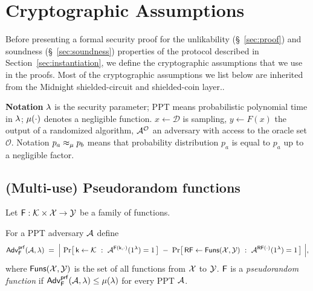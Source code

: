 \section{Cryptographic Assumptions}
\label{sec:assumptions}

Before presenting a formal security proof for the unlikability (\S~\ref{sec:proof}) and soundness (\S~\ref{sec:soundness})
properties of the protocol described in Section~\ref{sec:instantiation},
we define the cryptographic assumptions that we use in the proofs.
Most of the cryptographic assumptions we list below are inherited from the Midnight shielded-circuit and shielded-coin layer..


\vspace{5pt}
\noindent
\textbf{Notation}
$\lambda$ is the security parameter; PPT means probabilistic polynomial time in $\lambda$;
$\mu(\cdot)$ denotes a negligible function. $x \gets \mathcal{D}$ is sampling, $y \gets F(x)$ the output of a randomized algorithm, $\mathcal{A}^{\mathcal{O}}$ an adversary with access to the oracle set
$\mathcal{O}$.
Notation  $p_a\approx_{\mu}  p_b$ means that probability distribution $p_a$ is equal to $p_a$ up to a negligible factor.


\subsection{(Multi-use)  Pseudorandom functions}
\label{ssec:prf}

Let $\mathsf{F} : \mathcal{K} \times \mathcal{X} \to \mathcal{Y}$ be a family of functions.

\begin{definition}
\label{def:prf}
For a PPT adversary $\mathcal{A}$ define
\[
\AdvPRF_{\PRFfam}(\Adv,\secpar) \;=\;
\Bigl|\ \Pr\bigl[\,\prfkey \gets \prfKeySp \ :\ \Adv^{\PRFfam(\prfkey,\cdot)}(1^{\secpar}) = 1\,\bigr]
\;-\;
\Pr\bigl[\,\RandFun \gets \mathsf{Funs}(\prfDom,\prfRng) \ :\ \Adv^{\RandFun(\cdot)}(1^{\secpar}) = 1\,\bigr]\ \Bigr|,
\]
where $\mathsf{Funs}(\mathcal{X},\mathcal{Y})$ is the set of all functions from $\mathcal{X}$ to $\mathcal{Y}$.
$\mathsf{F}$ is a \emph{pseudorandom function} if $\mathsf{Adv}^{\mathsf{prf}}_{\mathsf{F}}(\mathcal{A},\lambda) \le \mu(\lambda)$
for every PPT $\mathcal{A}$.
\end{definition}


